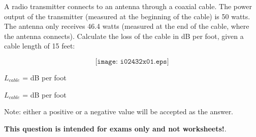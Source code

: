 

A radio transmitter connects to an antenna through a coaxial cable.  The power output of the transmitter (measured at the beginning of the cable) is 50 watts.  The antenna only receives 46.4 watts (measured at the end of the cable, where the antenna connects).  Calculate the loss of the cable in dB per foot, given a cable length of 15 feet:

$$\texttt{[image: i02432x01.eps]}$$

$L_{cable}$ = \underbar{\hskip 50pt} dB per foot







$L_{cable}$ =  dB per foot

\vskip 10pt

Note: either a positive or a negative value will be accepted as the answer.







{\bf This question is intended for exams only and not worksheets!}.



